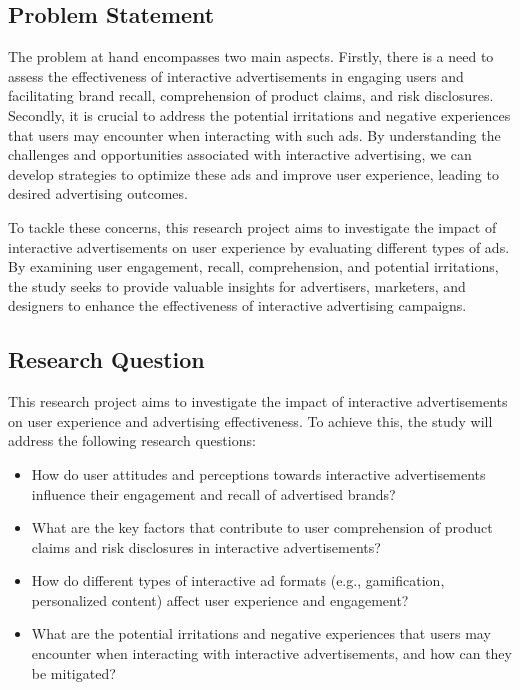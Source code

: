 \documentclass[journal]{IEEEtran}
\begin{document}
\subsection{Problem Statement}
The problem at hand encompasses two main aspects. Firstly, there is a need to assess the
effectiveness of interactive advertisements in engaging users and facilitating brand
recall, comprehension of product claims, and risk disclosures. Secondly, it is
crucial to address the potential irritations and negative experiences that
users may encounter when interacting with such ads. By understanding the challenges
and opportunities associated with interactive advertising, we can develop strategies
to optimize these ads and improve user experience, leading to desired advertising
outcomes.

To tackle these concerns, this research project aims to investigate the impact of
interactive advertisements on user experience by evaluating different types of ads.
By examining user engagement, recall, comprehension, and potential irritations, the
study seeks to provide valuable insights for advertisers, marketers, and designers
to enhance the effectiveness of interactive advertising campaigns.

\subsection{Research Question}
This research project aims to investigate the impact of interactive advertisements
on user experience and advertising effectiveness. To achieve this, the study will
address the following research questions:

\begin{itemize}
    \item How do user attitudes and perceptions towards interactive advertisements influence their engagement and recall of advertised brands?
    \item What are the key factors that contribute to user comprehension of product claims and risk disclosures in interactive advertisements?
    \item How do different types of interactive ad formats (e.g., gamification, personalized content) affect user experience and engagement?
    \item What are the potential irritations and negative experiences that users may encounter when interacting with interactive advertisements, and how can they be mitigated?
\end{itemize}
\end{document}
